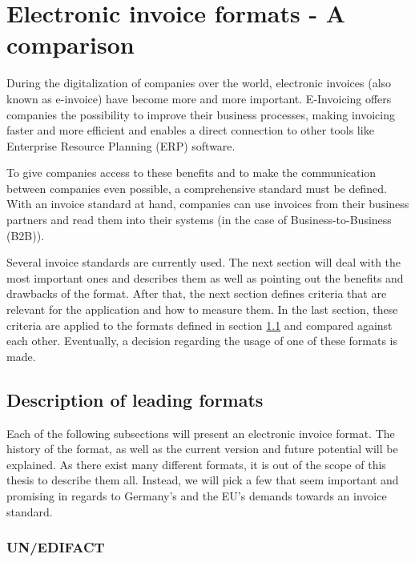 %
% 
\chapter{Electronic invoice formats - A comparison}
\label{cha2}

During the digitalization of companies over the world, electronic invoices (also known as e-invoice) have become more and more important. E-Invoicing offers companies the possibility to improve their business processes, making invoicing faster and more efficient and enables a direct connection to other tools like Enterprise Resource Planning (ERP) software. 

To give companies access to these benefits and to make the communication between companies even possible, a comprehensive standard must be defined. With an invoice standard at hand, companies can use invoices from their business partners and read them into their systems (in the case of Business-to-Business (B2B)). 

Several invoice standards are currently used. The next section will deal with the most important ones and describes them as well as pointing out the benefits and drawbacks of the format.
After that, the next section defines criteria that are relevant for the application and how to measure them.
In the last section, these criteria are applied to the formats defined in section \ref{sec2.1} and compared against each other. Eventually, a decision regarding the usage of one of these formats is made.

\section{Description of leading formats}
\label{sec2.1}

Each of the following subsections will present an electronic invoice format. The history of the format, as well as the current version and future potential will be explained. As there exist many different formats, it is out of the scope of this thesis to describe them all.
Instead, we will pick a few that seem important and promising in regards to Germany's and the EU's demands towards an invoice standard. 

\subsection{UN/EDIFACT}
\label{sec2.1.1}

